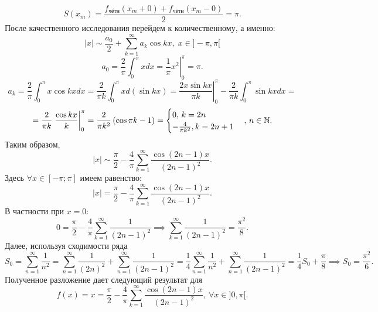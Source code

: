 \documentclass[../../main.tex]{subfiles}
\begin{document}
\begin{examples}
\begin{enumerate}
				\[
					S(x_m) = \frac{f_{\text{чётн}}(x_m+0)+ f_{\text{чётн}}(x_m-0)}{2} = \pi.
				\]
				После качественного исследования перейдем к количественному, а именно:
				\[
					|x| \sim \frac{a_0}{2} + \sum_{k=1}^{\infty}  a_k \cos k x, \; x \in 
					]-\pi, \pi[
				\]
				\[
					a_0 = \frac{2}{\pi} \int_{0}^{\pi}xdx = \left. \frac{1}{\pi} x^2 
					\right|_0^{\pi} = \pi.
				\]
				\[
					a_k = \frac{2}{\pi} \int_{0}^{\pi}x \cos kx dx = 
					\frac{2}{\pi k } \int_{0}^{\pi}x d (\sin kx) = 
					\left. \frac{2x \sin kx}{\pi k}\right|_0^{\pi} - \frac{2}{\pi k} 
					\int_{0}^{\pi}\sin kx dx = 
				\]
				\[
				 = \frac{2}{\pi k} \left. \frac{\cos k x}{k} \right|_0^{\pi} =
				 \frac{2}{\pi k^2} \left( \cos \pi k - 1 \right) = 
				 \begin{cases}
				 0, \, k = 2n \\
				 -\frac{4}{\pi k^2}, k = 2n+1
				 \end{cases}, \, n \in \mathbb{N}.
				\]
				Таким образом,
				\[
					|x| \sim \frac{\pi}{2} - \frac{4}{\pi} 
					\sum_{k=1}^{\infty}\frac{\cos(2n-1)x}{(2n-1)^2}.
				\]
				Здесь $\forall x \in [-\pi; \pi]$ имеем равенство:
				\[
					|x| = \frac{\pi}{2} - \frac{4}{\pi} 
					\sum_{k=1}^{\infty}\frac{\cos(2n-1)x}{(2n-1)^2}.
				\]
				В частности при $x = 0:$
				\[
					0 = \frac{\pi}{2} - \frac{4}{\pi} \sum_{k=1}^{\infty}\frac{1}{(2n-1)^2} 
					\implies  \sum_{k=1}^{\infty}\frac{1}{(2n-1)^2} = \frac{\pi^2}{8}.
				\]
				Далее, используя сходимости ряда
				\[
					S_0 = \sum_{n=1}^{\infty} \frac{1}{n^2} = \sum_{n=1}^{\infty} 
					\frac{1}{(2n)^2}  + \sum_{n=1}^{\infty} \frac{1}{(2n-1)^2} = 
					\frac{1}{4} \sum_{n=1}^{\infty} \frac{1}{n^2} +  \sum_{n=1}^{\infty} 
					\frac{1}{(2n-1)^2} =
					\frac{1}{4}S_0 + \frac{\pi}{8} \implies S_0 = \frac{\pi^2}{6}.
				\]
				Полученное разложение дает следующий результат для 
				\[
					f(x) = x = \frac{\pi}{2} - \frac{4}{\pi} 
					\sum_{k=1}^{\infty}\frac{\cos(2n-1)x}{(2n-1)^2}, \ \forall x \in ]0, \pi[.
				\]
			\end{enumerate}
		\end{examples}
\end{document}
